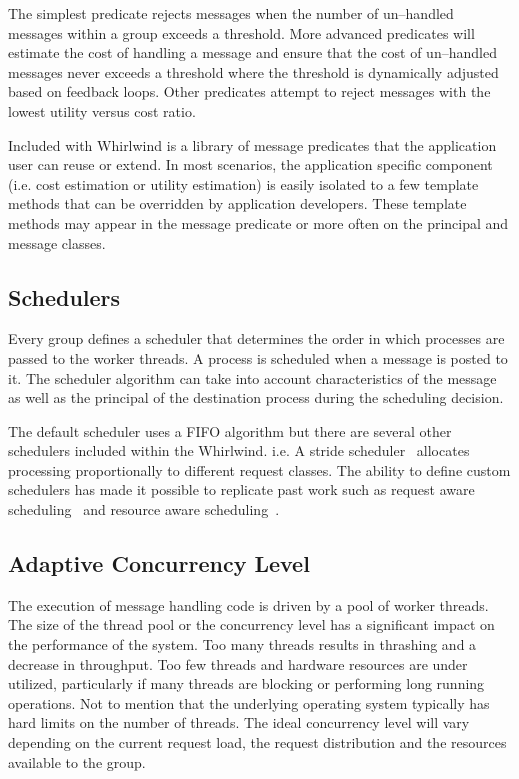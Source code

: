 \documentclass[conference]{IEEEtran}
\begin{document}
The simplest predicate rejects messages when the number of un--handled messages within a group exceeds a threshold. More advanced predicates will estimate the cost of handling a message and ensure that the cost of un--handled messages never exceeds a threshold where the threshold is dynamically adjusted based on feedback loops. Other predicates attempt to reject messages with the lowest utility versus cost ratio.

Included with Whirlwind is a library of message predicates that the application user can reuse or extend. In most scenarios, the application specific component (i.e. cost estimation or utility estimation) is easily isolated to a few template methods that can be overridden by application developers. These template methods may appear in the message predicate or more often on the principal and message classes.

\subsection{Schedulers}

Every group defines a scheduler that determines the order in which processes are passed to the worker threads. A process is scheduled when a message is posted to it. The scheduler algorithm can take into account characteristics of the message as well as the principal of the destination process during the scheduling decision.

The default scheduler uses a FIFO algorithm but there are several other schedulers included within the Whirlwind. i.e. A stride scheduler~\cite{Stride:Waldspurger:95} allocates processing proportionally to different request classes. The ability to define custom schedulers has made it possible to replicate past work such as request aware scheduling~\cite{Zhou06RequestAware} and resource aware scheduling~\cite{Behren03Capriccio}.

\subsection{Adaptive Concurrency Level}

The execution of message handling code is driven by a pool of worker threads. The size of the thread pool or the concurrency level has a significant impact on the performance of the system. Too many threads results in thrashing and a decrease in throughput. Too few threads and hardware resources are under utilized, particularly if many threads are blocking or performing long running operations. Not to mention that the underlying operating system typically has hard limits on the number of threads. The ideal concurrency level will vary depending on the current request load, the request distribution and the resources available to the group.
\end{document}
